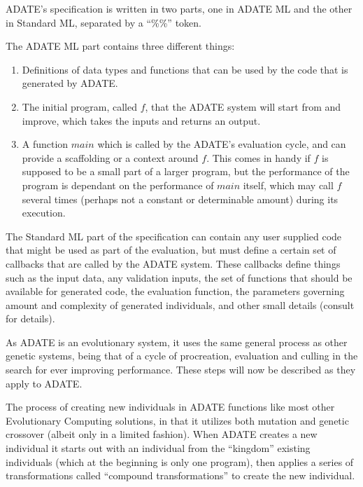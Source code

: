 \documentclass[]{report}
\begin{document}
ADATE's specification is written in two parts, one in ADATE ML and the other in
Standard ML, separated by a ``\%\%'' token.

The ADATE ML part contains three different things:
\begin{enumerate}
\item Definitions of data types and functions that can be used by the code that
  is generated by ADATE.
\item The initial program, called \(f\), that the ADATE system will start from
  and improve, which takes the inputs and returns an output.
\item A function \(main\) which is called by the ADATE's evaluation cycle, and
  can provide a scaffolding or a context around \(f\). This comes in handy
  if \(f\) is supposed to be a small part of a larger program, but the
  performance of the program is dependant on the performance of \(main\)
  itself, which may call \(f\) several times (perhaps not a constant or
  determinable amount) during its execution.
\end{enumerate}

The Standard ML part of the specification can contain any user supplied code
that might be used as part of the evaluation, but must define a certain set of
callbacks that are called by the ADATE system. These callbacks define things
such as the input data, any validation inputs, the set of functions that should
be available for generated code, the evaluation function, the parameters
governing amount and complexity of generated individuals, and other small
details (consult \citet[sect.~4.2]{vattekar2006adate} for details).

As ADATE is an evolutionary system, it uses the same general process as other
genetic systems, being that of a cycle of procreation, evaluation and culling in
the search for ever improving performance. These steps will now be described as
they apply to ADATE.

The process of creating new individuals in ADATE functions like most other
Evolutionary Computing solutions, in that it utilizes both mutation and genetic
crossover (albeit only in a limited fashion). When ADATE creates a new
individual it starts out with an individual from the ``kingdom'' existing
individuals (which at the beginning is only one program), then applies a series
of transformations called ``compound transformations'' to create the new
individual.
\end{document}
